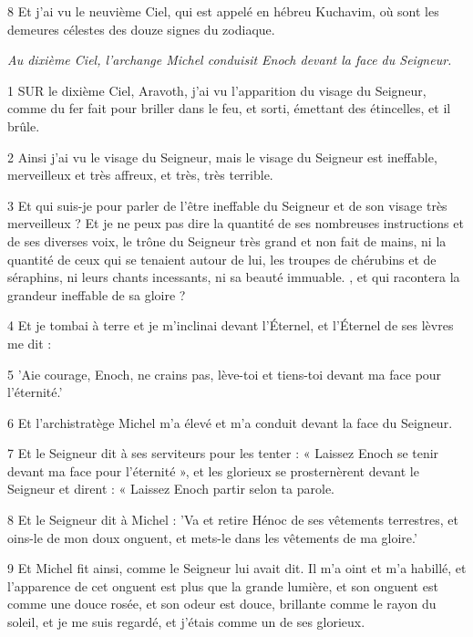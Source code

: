 \par 8 Et j'ai vu le neuvième Ciel, qui est appelé en hébreu Kuchavim, où sont les demeures célestes des douze signes du zodiaque.


\par \textit{Au dixième Ciel, l'archange Michel conduisit Enoch devant la face du Seigneur.}

\par 1 SUR le dixième Ciel, Aravoth, j'ai vu l'apparition du visage du Seigneur, comme du fer fait pour briller dans le feu, et sorti, émettant des étincelles, et il brûle.

\par 2 Ainsi j'ai vu le visage du Seigneur, mais le visage du Seigneur est ineffable, merveilleux et très affreux, et très, très terrible.

\par 3 Et qui suis-je pour parler de l'être ineffable du Seigneur et de son visage très merveilleux ? Et je ne peux pas dire la quantité de ses nombreuses instructions et de ses diverses voix, le trône du Seigneur très grand et non fait de mains, ni la quantité de ceux qui se tenaient autour de lui, les troupes de chérubins et de séraphins, ni leurs chants incessants, ni sa beauté immuable. , et qui racontera la grandeur ineffable de sa gloire ?

\par 4 Et je tombai à terre et je m'inclinai devant l'Éternel, et l'Éternel de ses lèvres me dit :

\par 5 'Aie courage, Enoch, ne crains pas, lève-toi et tiens-toi devant ma face pour l'éternité.'

\par 6 Et l'archistratège Michel m'a élevé et m'a conduit devant la face du Seigneur.

\par 7 Et le Seigneur dit à ses serviteurs pour les tenter : « Laissez Enoch se tenir devant ma face pour l'éternité », et les glorieux se prosternèrent devant le Seigneur et dirent : « Laissez Enoch partir selon ta parole.

\par 8 Et le Seigneur dit à Michel : 'Va et retire Hénoc de ses vêtements terrestres, et oins-le de mon doux onguent, et mets-le dans les vêtements de ma gloire.'

\par 9 Et Michel fit ainsi, comme le Seigneur lui avait dit. Il m'a oint et m'a habillé, et l'apparence de cet onguent est plus que la grande lumière, et son onguent est comme une douce rosée, et son odeur est douce, brillante comme le rayon du soleil, et je me suis regardé, et j'étais comme un de ses glorieux.

